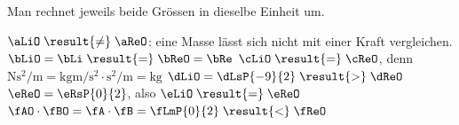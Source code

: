 Man rechnet jeweils beide Grössen in dieselbe Einheit um.
\begin{abcliste}
\abc $\aLiO \;\result{\neq}\; \aReO$: eine Masse lässt sich nicht mit einer Kraft vergleichen.
\abc $\bLiO = \bLi \;\result{=}\; \bReO = \bRe$
\abc $\cLiO \;\result{=}\; \cReO$, denn $\si{\newton\second\squared\per\meter} = \si{\kilo\gram\meter\per\second\squared}\cdot\si{\second\squared\per\meter} = \si{\kilo\gram}$
\abc $\dLiO = \dLsP{-9}{2} \;\result{>}\; \dReO$
\abc $\eReO = \eRsP{0}{2}$, also $\eLiO \;\result{=}\; \eReO$
\abc $\fAO\cdot\fBO = \fA\cdot\fB = \fLmP{0}{2} \;\result{<}\; \fReO$
\end{abcliste}

